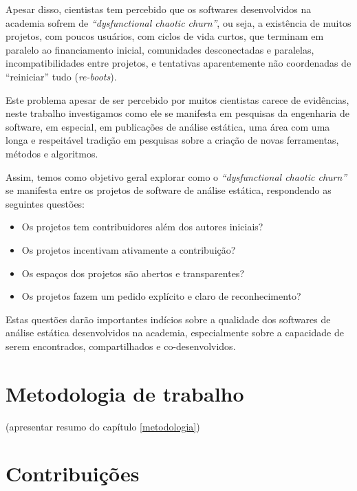 Apesar disso, cientistas tem percebido que os softwares desenvolvidos na
academia sofrem de {\it ``dysfunctional chaotic churn''}, ou seja, a existência
de muitos projetos, com poucos usuários, com ciclos de vida curtos, que
terminam em paralelo ao financiamento inicial, comunidades desconectadas e
paralelas, incompatibilidades entre projetos, e tentativas aparentemente não
coordenadas de ``reiniciar'' tudo ({\it re-boots}).


Este problema apesar de ser percebido por muitos cientistas carece de
evidências, neste trabalho investigamos como ele se manifesta em pesquisas da
engenharia de software, em especial, em publicações de análise estática, uma
área com uma longa e respeitável tradição em pesquisas sobre a criação de novas
ferramentas, métodos e algoritmos.

Assim, temos como objetivo geral explorar como o {\it ``dysfunctional chaotic
churn''} se manifesta entre os projetos de software de análise estática,
respondendo as seguintes questões:

\begin{itemize}
  \item Os projetos tem contribuidores além dos autores iniciais?
  \item Os projetos incentivam ativamente a contribuição?
  \item Os espaços dos projetos são abertos e transparentes?
  \item Os projetos fazem um pedido explícito e claro de reconhecimento?
\end{itemize}

Estas questões darão importantes indícios sobre a qualidade dos softwares de
análise estática desenvolvidos na academia, especialmente sobre a capacidade de
serem encontrados, compartilhados e co-desenvolvidos.

\section{Metodologia de trabalho}

(apresentar resumo do capítulo \ref{metodologia})

\section{Contribuições}

